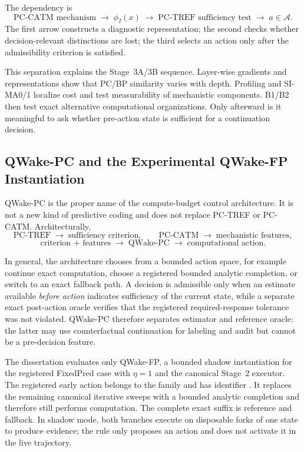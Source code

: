 The dependency is
\[
  \text{PC-CATM mechanism}
  \;\longrightarrow\;
  \phi_I(x)
  \;\longrightarrow\;
  \text{PC-TREF sufficiency test}
  \;\longrightarrow\;
  a\in\mathcal A.
\]
The first arrow constructs a diagnostic representation; the second checks whether
decision-relevant distinctions are lost; the third selects an action only after the
admissibility criterion is satisfied.

This separation explains the Stage~3A/3B sequence. Layer-wise gradients and
representations show that PC/BP similarity varies with depth. Profiling and SI-MA0/1
localize cost and test measurability of mechanistic components. B1/B2 then test exact
alternative computational organizations. Only afterward is it meaningful to ask
whether pre-action state is sufficient for a continuation decision.

\subsection{QWake-PC and the Experimental QWake-FP Instantiation}
\label{sec:theory-qwake}

QWake-PC is the proper name of the compute-budget control architecture. It is not a new
kind of predictive coding and does not replace PC-TREF or PC-CATM. Architecturally,
\[
  \text{PC-TREF}\;\longrightarrow\;\text{sufficiency criterion},
  \qquad
  \text{PC-CATM}\;\longrightarrow\;\text{mechanistic features},
\]
\[
  \text{criterion + features}
  \;\longrightarrow\;
  \text{QWake-PC}
  \;\longrightarrow\;
  \text{computational action}.
\]

In general, the architecture chooses from a bounded action space, for example continue
exact computation, choose a registered bounded analytic completion, or switch to an
exact fallback path. A decision is admissible only when an estimate available
\emph{before action} indicates sufficiency of the current state, while a separate exact
post-action oracle verifies that the registered required-response tolerance was not
violated. QWake-PC therefore separates estimator and reference oracle: the latter may
use counterfactual continuation for labeling and audit but cannot be a pre-decision
feature.

The dissertation evaluates only QWake-FP, a bounded shadow instantiation for the
registered FixedPred case with $\eta=1$ and the canonical Stage~2 executor. The
registered early action belongs to the  family and has
identifier . It replaces the remaining
canonical iterative sweeps with a bounded analytic completion and therefore still
performs computation. The complete exact suffix
 is reference and fallback. In shadow mode,
both branches execute on disposable forks of one state to produce evidence; the rule
only proposes an action and does not activate it in the live trajectory.

